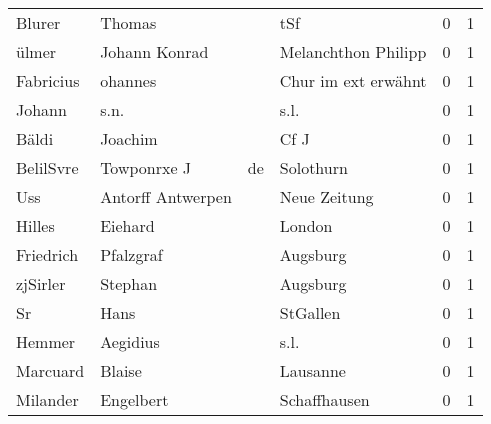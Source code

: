 \begin{tabular}{llllrr}
                   Blurer &                             Thomas &             &                                         tSf &          0 &         1 \\
                    ülmer &                      Johann Konrad &             &                         Melanchthon Philipp &          0 &         1 \\
                Fabricius &                            ohannes &             &                         Chur im ext erwähnt &          0 &         1 \\
                   Johann &                               s.n. &             &                                        s.l. &          0 &         1 \\
                    Bäldi &                            Joachim &             &                                        Cf J &          0 &         1 \\
                BelilSvre &                        Towponrxe J &          de &                                   Solothurn &          0 &         1 \\
                      Uss &                  Antorff Antwerpen &             &                                Neue Zeitung &          0 &         1 \\
                   Hilles &                            Eiehard &             &                                      London &          0 &         1 \\
                Friedrich &                          Pfalzgraf &             &                                    Augsburg &          0 &         1 \\
                 zjSirler &                            Stephan &             &                                    Augsburg &          0 &         1 \\
                       Sr &                               Hans &             &                                    StGallen &          0 &         1 \\
                   Hemmer &                           Aegidius &             &                                        s.l. &          0 &         1 \\
                 Marcuard &                             Blaise &             &                                    Lausanne &          0 &         1 \\
                 Milander &                          Engelbert &             &                                Schaffhausen &          0 &         1 \\

\end{tabular}
